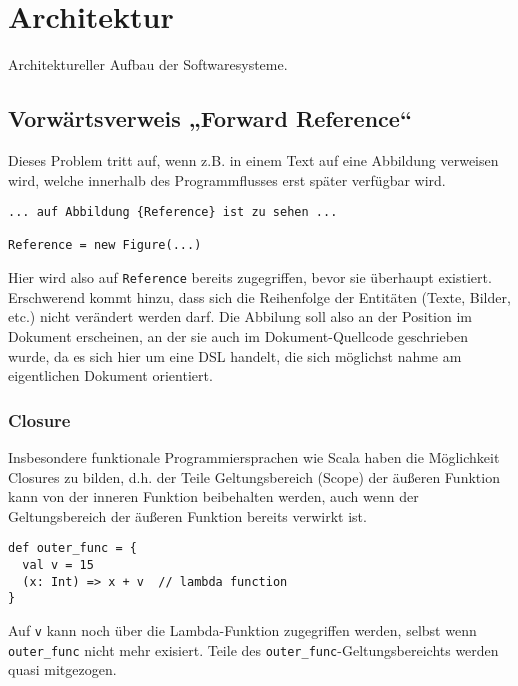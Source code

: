 \chapter{Architektur}

Architektureller Aufbau der Softwaresysteme.

\section{Vorwärtsverweis „Forward Reference“}

Dieses Problem tritt auf, wenn z.B. in einem Text auf eine Abbildung
verweisen wird, welche innerhalb des Programmflusses erst später verfügbar
wird.

\begin{lstlisting}
... auf Abbildung {Reference} ist zu sehen ...

Reference = new Figure(...)
\end{lstlisting}

Hier wird also auf \lstinline|Reference| bereits zugegriffen,
bevor sie überhaupt existiert. Erschwerend kommt hinzu, dass sich die
Reihenfolge der Entitäten (Texte, Bilder, etc.) nicht verändert werden darf.
Die Abbilung soll also an der Position im Dokument erscheinen, an der sie
auch im Dokument-Quellcode geschrieben wurde, da es sich hier um eine DSL
handelt, die sich möglichst nahme am eigentlichen Dokument orientiert.



\subsection{Closure}

Insbesondere funktionale Programmiersprachen wie Scala haben die
Möglichkeit Closures zu bilden, d.h. der Teile Geltungsbereich (Scope)
der äußeren Funktion  kann von der inneren Funktion beibehalten werden,
auch wenn der Geltungsbereich der äußeren Funktion bereits verwirkt ist.

\begin{lstlisting}
def outer_func = {
  val v = 15
  (x: Int) => x + v  // lambda function
}
\end{lstlisting}

Auf \lstinline|v| kann noch über die Lambda-Funktion zugegriffen werden,
selbst wenn \lstinline|outer_func| nicht mehr exisiert. Teile des
\lstinline|outer_func|-Geltungsbereichts werden quasi mitgezogen.

